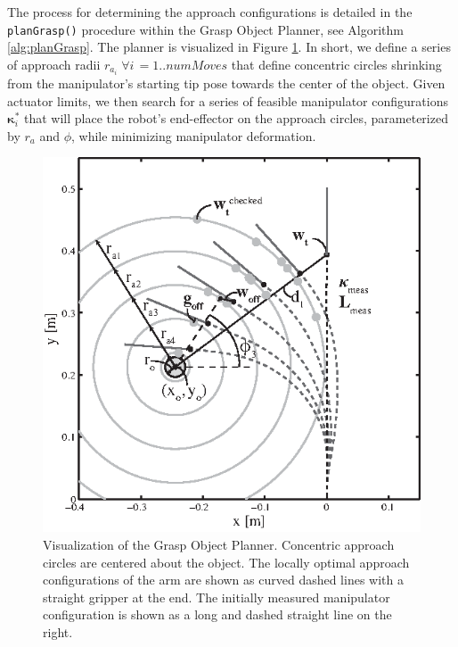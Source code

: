 The process for determining the approach configurations is detailed in the \texttt{planGrasp()} procedure within the Grasp Object Planner, see Algorithm \ref{alg:planGrasp}.
The planner is visualized in Figure \ref{fig:planGrasp}.
In short, we define a series of approach radii $r_{a_i} \;  \forall i\, = 1.. numMoves$ that define concentric circles shrinking from the manipulator's starting tip pose towards the center of the object.
Given actuator limits, we then search for a series of feasible manipulator configurations $\boldsymbol{\kappa}_i^*$ that will place the robot's end-effector on the approach circles, parameterized by $r_a$ and $\phi$, while minimizing manipulator deformation.

\begin{figure}[htpb]
\centering
   \includegraphics[width=0.85\columnwidth, trim = 0mm 0mm 5mm 5mm, clip]{Figures/processing_control/grasp_object_planner_bw.eps}
   \caption{Visualization of the Grasp Object Planner. Concentric approach circles are centered about the object. The locally optimal approach configurations of the arm are shown as curved dashed lines with a straight gripper at the end. The initially measured manipulator configuration is shown as a long and dashed straight line on the right.}
   \label{fig:planGrasp}
\end{figure}

